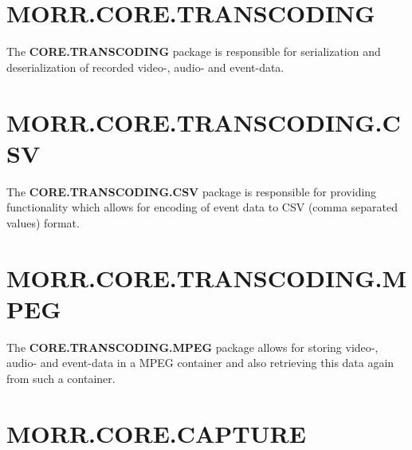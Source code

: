 \section*{MORR.CORE.TRANSCODING}

The \textbf{CORE.TRANSCODING} package is responsible for serialization and deserialization of recorded video-, audio- and event-data.

\begin{packif}
\end{packif}

\begin{packclass}
\end{packclass}

\begin{packpack}
\end{packpack}

\section*{MORR.CORE.TRANSCODING.CSV}
The \textbf{CORE.TRANSCODING.CSV} package is responsible for providing functionality which allows for encoding of event data to CSV (comma separated values) format.

\begin{packclass}
\end{packclass}

\section*{MORR.CORE.TRANSCODING.MPEG}
The \textbf{CORE.TRANSCODING.MPEG} package allows for storing video-, audio- and event-data in a MPEG container and also retrieving this data again from such a container.

\begin{packclass}
\end{packclass}

\section*{MORR.CORE.CAPTURE}

